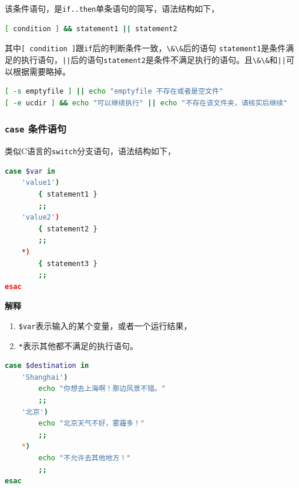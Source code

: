 \documentclass[doctor,openright,twoside]{sjtuthesis}
\providecommand{\tightlist}{%
    \setlength{\itemsep}{0pt}\setlength{\parskip}{0pt}}
\newcommand{\passthrough}[1]{#1}
\theoremstyle{plain}
\theoremstyle{definition}
\theoremstyle{remark}
\theoremstyle{ocrenumbox}
\theoremstyle{plain}
\begin{document}
该条件语句，是\passthrough{\lstinline!if..then!}单条语句的简写，语法结构如下，

\begin{lstlisting}[language=bash]
[ condition ] && statement1 || statement2
\end{lstlisting}

其中\passthrough{\lstinline![ condition ]!}跟\passthrough{\lstinline!if!}后的判断条件一致，\passthrough{\lstinline!\&\&!}后的语句 \passthrough{\lstinline!statement1!}是条件满足的执行语句，\passthrough{\lstinline!||!}后的语句\passthrough{\lstinline!statement2!}是条件不满足执行的语句。且\passthrough{\lstinline!\&\&!}和\passthrough{\lstinline!||!}可以根据需要略掉。

\begin{lstlisting}[language=bash]
[ -s emptyfile ] || echo "emptyfile 不存在或者是空文件"
[ -e ucdir ] && echo "可以继续执行" || echo "不存在该文件夹，请核实后继续"
\end{lstlisting}

\hypertarget{case-}{%
\subsubsection{\texorpdfstring{\texttt{case} 条件语句}{case 条件语句}}\label{case-}}

类似C语言的\passthrough{\lstinline!switch!}分支语句，语法结构如下，

\begin{lstlisting}[language=bash]
case $var in
    'value1')
        { statement1 }
        ;;
    'value2')
        { statement2 }
        ;;
    *)
        { statement3 }
        ;;
esac
\end{lstlisting}

\textbf{解释}

\begin{enumerate}
\def\labelenumi{\arabic{enumi}.}
\tightlist
\item
  \passthrough{\lstinline!$var!}表示输入的某个变量，或者一个运行结果，
\item
  \passthrough{\lstinline!*!}表示其他都不满足的执行语句。
\end{enumerate}

\begin{lstlisting}[language=bash]
case $destination in
    'Shanghai')
        echo "你想去上海啊！那边风景不错。"
        ;;
    '北京')
        echo "北京天气不好，雾霾多！"
        ;;
    *)
        echo "不允许去其他地方！"
        ;;
esac
\end{lstlisting}
\end{document}
